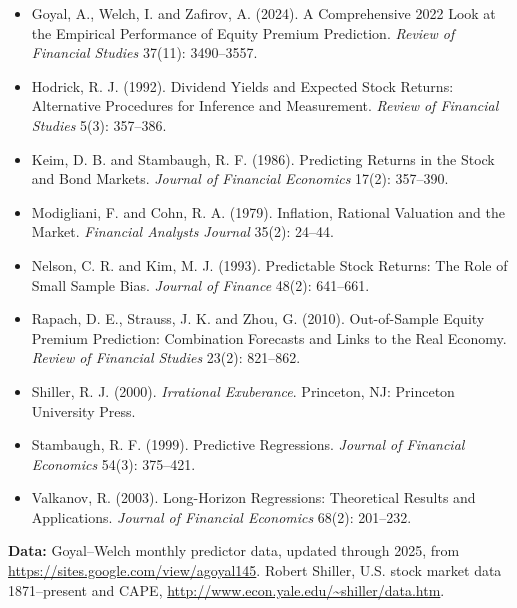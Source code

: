 \begin{itemize}
  \item Goyal, A., Welch, I. and Zafirov, A. (2024). A Comprehensive 2022 Look at the Empirical Performance of Equity Premium Prediction. \emph{Review of Financial Studies} 37(11): 3490--3557.
  \item Hodrick, R. J. (1992). Dividend Yields and Expected Stock Returns: Alternative Procedures for Inference and Measurement. \emph{Review of Financial Studies} 5(3): 357--386.
  \item Keim, D. B. and Stambaugh, R. F. (1986). Predicting Returns in the Stock and Bond Markets. \emph{Journal of Financial Economics} 17(2): 357--390.
  \item Modigliani, F. and Cohn, R. A. (1979). Inflation, Rational Valuation and the Market. \emph{Financial Analysts Journal} 35(2): 24--44.
  \item Nelson, C. R. and Kim, M. J. (1993). Predictable Stock Returns: The Role of Small Sample Bias. \emph{Journal of Finance} 48(2): 641--661.
  \item Rapach, D. E., Strauss, J. K. and Zhou, G. (2010). Out-of-Sample Equity Premium Prediction: Combination Forecasts and Links to the Real Economy. \emph{Review of Financial Studies} 23(2): 821--862.
  \item Shiller, R. J. (2000). \emph{Irrational Exuberance}. Princeton, NJ: Princeton University Press.
  \item Stambaugh, R. F. (1999). Predictive Regressions. \emph{Journal of Financial Economics} 54(3): 375--421.
  \item Valkanov, R. (2003). Long-Horizon Regressions: Theoretical Results and Applications. \emph{Journal of Financial Economics} 68(2): 201--232.
\end{itemize}

\textbf{Data:} Goyal--Welch monthly predictor data, updated through 2025, from \url{https://sites.google.com/view/agoyal145}. Robert Shiller, U.S. stock market data 1871--present and CAPE, \url{http://www.econ.yale.edu/~shiller/data.htm}.
